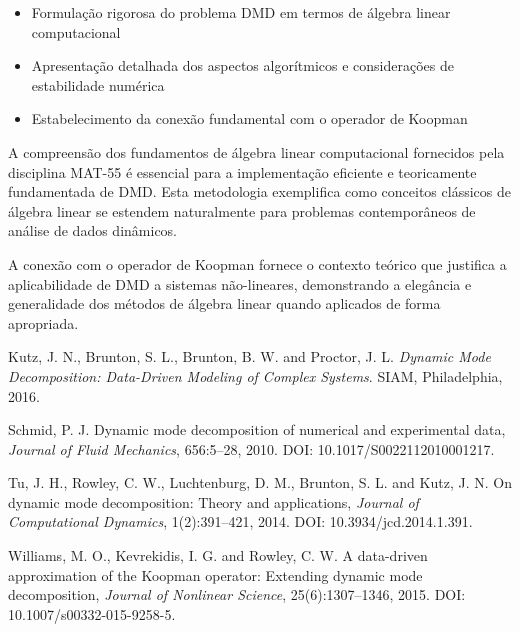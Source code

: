\documentclass[a4,11pt]{pssbmac}
\begin{document}
\begin{itemize}
\item Formulação rigorosa do problema DMD em termos de álgebra linear computacional
\item Apresentação detalhada dos aspectos algorítmicos e considerações de estabilidade numérica
\item Estabelecimento da conexão fundamental com o operador de Koopman
\end{itemize}

A compreensão dos fundamentos de álgebra linear computacional fornecidos pela disciplina MAT-55 é essencial para a implementação eficiente e teoricamente fundamentada de DMD. Esta metodologia exemplifica como conceitos clássicos de álgebra linear se estendem naturalmente para problemas contemporâneos de análise de dados dinâmicos.

A conexão com o operador de Koopman fornece o contexto teórico que justifica a aplicabilidade de DMD a sistemas não-lineares, demonstrando a elegância e generalidade dos métodos de álgebra linear quando aplicados de forma apropriada.

\begin{thebibliography}{00}

Kutz, J. N., Brunton, S. L., Brunton, B. W. and Proctor, J. L. {\it Dynamic Mode Decomposition: Data-Driven Modeling of Complex Systems}. SIAM, Philadelphia, 2016.

Schmid, P. J. Dynamic mode decomposition of numerical and experimental data, {\it Journal of Fluid Mechanics}, 656:5--28, 2010. DOI: 10.1017/S0022112010001217.

Tu, J. H., Rowley, C. W., Luchtenburg, D. M., Brunton, S. L. and Kutz, J. N. On dynamic mode decomposition: Theory and applications, {\it Journal of Computational Dynamics}, 1(2):391--421, 2014. DOI: 10.3934/jcd.2014.1.391.

Williams, M. O., Kevrekidis, I. G. and Rowley, C. W. A data-driven approximation of the Koopman operator: Extending dynamic mode decomposition, {\it Journal of Nonlinear Science}, 25(6):1307--1346, 2015. DOI: 10.1007/s00332-015-9258-5.

\end{thebibliography}
\end{document}
